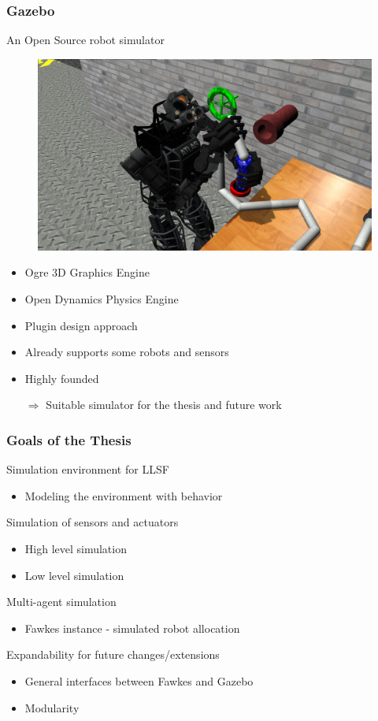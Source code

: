 \documentclass[]{beamer}
\begin{document}
\begin{frame}
\frametitle{Gazebo}
\begin{multicols}{2}
An Open Source robot simulator
\begin{figure}
\includegraphics[scale=0.125]{pics/gazebo.jpg}
\end{figure}
\begin{itemize}
\item Ogre 3D Graphics Engine %
\item Open Dynamics Physics Engine %
\item Plugin design approach
\item Already supports some robots and sensors %
\item Highly founded
\end{itemize}
\end{multicols}
\pause
\begin{itemize}
\item[$\Rightarrow$] Suitable simulator for the thesis and future work
\end{itemize}
\end{frame}

\begin{frame}
\frametitle{Goals of the Thesis}
Simulation environment for LLSF
\begin{itemize}
\item Modeling the environment with behavior
\end{itemize}
\pause
Simulation of sensors and actuators
\begin{itemize}
\item High level simulation
\item Low level simulation
\end{itemize}
Multi-agent simulation
\begin{itemize}
\item Fawkes instance - simulated robot allocation
\end{itemize}
\pause
Expandability for future changes/extensions
\begin{itemize}
\item General interfaces between Fawkes and Gazebo
\item Modularity
\end{itemize}
\end{frame}
\end{document}
